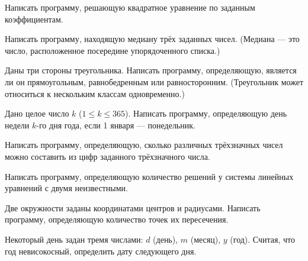 \task Написать программу, решающую квадратное уравнение по заданным
коэффициентам.

\task Написать программу, находящую медиану трёх заданных
чисел. (Медиана — это число, расположенное посередине упорядоченного
списка.)

\task Даны три стороны треугольника. Написать программу, определяющую,
является ли он прямоугольным, равнобедренным или
равносторонним. (Треугольник может относиться к нескольким классам
одновременно.)

\task Дано целое число $k$ ($1 \leqslant k \leqslant 365$). Написать
программу, определяющую день недели $k$-го дня года, если 1 января —
понедельник.

\task Написать программу, определяющую, сколько различных трёхзначных
чисел можно составить из цифр заданного трёхзначного числа.

\task Написать программу, определяющую количество решений у системы
линейных уравнений с двумя неизвестными.

\task Две окружности заданы координатами центров и радиусами. Написать
программу, определяющую количество точек их пересечения.

\task Некоторый день задан тремя числами: $d$ (день), $m$ (месяц), $y$
(год). Считая, что год невисокосный, определить дату следующего дня.
